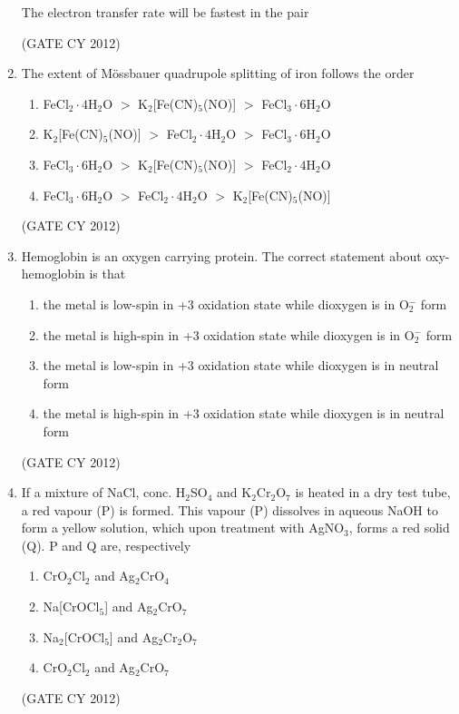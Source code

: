 \documentclass[12pt]{article}
\begin{document}
\begin{enumerate}
The electron transfer rate will be fastest in the pair  

\begin{enumerate}
\end{enumerate}
\hfill (GATE CY 2012)


\item The extent of M\"ossbauer quadrupole splitting of iron follows the order
\begin{enumerate}
\item FeCl$_2 \cdot 4$H$_2$O $>$ K$_2$[Fe(CN)$_5$(NO)] $>$ FeCl$_3 \cdot 6$H$_2$O
\item K$_2$[Fe(CN)$_5$(NO)] $>$ FeCl$_2 \cdot 4$H$_2$O $>$ FeCl$_3 \cdot 6$H$_2$O
\item FeCl$_3 \cdot 6$H$_2$O $>$ K$_2$[Fe(CN)$_5$(NO)] $>$ FeCl$_2 \cdot 4$H$_2$O
\item FeCl$_3 \cdot 6$H$_2$O $>$ FeCl$_2 \cdot 4$H$_2$O $>$ K$_2$[Fe(CN)$_5$(NO)]
\end{enumerate}
\hfill (GATE CY 2012)


\item Hemoglobin is an oxygen carrying protein. The correct statement about oxy-hemoglobin is that
\begin{enumerate}
\item the metal is low-spin in +3 oxidation state while dioxygen is in O$_2^-$ form
\item the metal is high-spin in +3 oxidation state while dioxygen is in O$_2^-$ form
\item the metal is low-spin in +3 oxidation state while dioxygen is in neutral form
\item the metal is high-spin in +3 oxidation state while dioxygen is in neutral form
\end{enumerate}
\hfill (GATE CY 2012)


\item If a mixture of NaCl, conc. H$_2$SO$_4$ and K$_2$Cr$_2$O$_7$ is heated in a dry test tube, a red vapour (P) is formed. This vapour (P) dissolves in aqueous NaOH to form a yellow solution, which upon treatment with AgNO$_3$, forms a red solid (Q). P and Q are, respectively
\begin{multicols}{2}
\begin{enumerate}
\item CrO$_2$Cl$_2$ and Ag$_2$CrO$_4$
\item Na[CrOCl$_5$] and Ag$_2$CrO$_7$
\item Na$_2$[CrOCl$_5$] and Ag$_2$Cr$_2$O$_7$
\item CrO$_2$Cl$_2$ and Ag$_2$CrO$_7$
\end{enumerate}
\end{multicols}
\hfill (GATE CY 2012)


\end{enumerate}
\end{document}

